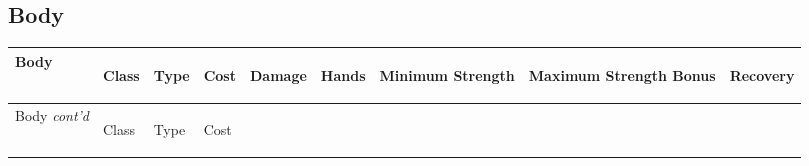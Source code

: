 \documentclass[twoside]{book}
\begin{document}
\hspace{-2ex}

\vspace{1ex}
    
    

\subsection{Body}
    
\begin{longtable}{p{1.25in}llllp{2em}p{3em}p{3em}l} 
  Body
  &
  \begin{turn}{70}{Class}\end{turn}
          
  &
  \begin{turn}{70}{Type}\end{turn}
          
  &
  \begin{turn}{70}{Cost}\end{turn}
          
  &
  \begin{turn}{70}{Damage}\end{turn}
          
  &
  \begin{turn}{70}{Hands}\end{turn}
          
  &
  \begin{turn}{70}{Minimum Strength}\end{turn}
          
  &
  \begin{turn}{70}{Maximum Strength Bonus}\end{turn}
          
  &
  \begin{turn}{70}{Recovery}\end{turn}
          
  \\
  \hline
  \hline
  \endfirsthead
  Body \textit{cont'd}
        
  &
  \begin{turn}{70}{Class}\end{turn}
          
  &
  \begin{turn}{70}{Type}\end{turn}
          
  &
  \begin{turn}{70}{Cost}\end{turn}
          

\end{longtable}
\end{document}
